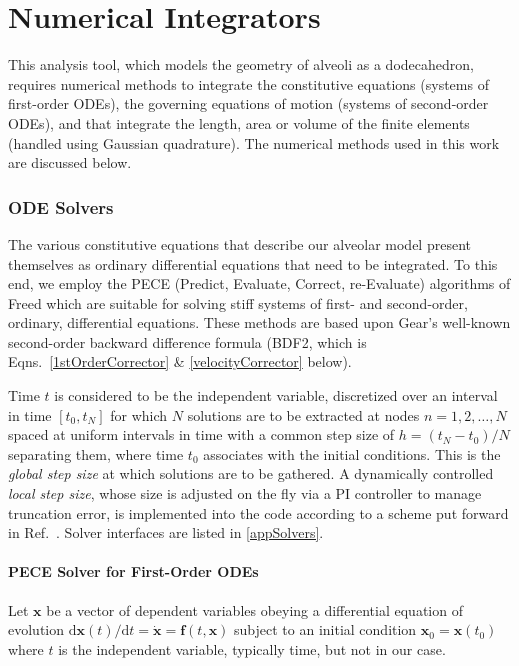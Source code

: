 \part{Numerical Integrators}
\label{partNumericalMethods}

This analysis tool, which models the geometry of alveoli as a dodecahedron, requires numerical methods to integrate the constitutive equations (systems of first-order ODEs), the governing equations of motion (systems of second-order ODEs), and that integrate the length, area or volume of the finite elements (handled using Gaussian quadrature).  The numerical methods used in this work are discussed below.

\section{ODE Solvers}

The various constitutive equations that describe our alveolar model present themselves as ordinary differential equations that need to be integrated.  To this end, we employ the PECE (Predict, Evaluate, Correct, re-Evaluate) algorithms of Freed \cite{Freed17a} which are suitable for solving stiff systems of first- and second-order, ordinary, differential equations.  These methods are based upon Gear's well-known second-order backward difference formula (BDF2, which is Eqns.~\ref{1stOrderCorrector} \& \ref{velocityCorrector} below).

Time $t$ is considered to be the independent variable, discretized over an interval in time $[t_0, t_N]$ for which $N$ solutions are to be extracted at nodes $n=1, 2, \ldots, N$ spaced at uniform intervals in time with a common step size of $h = (t_N - t_0)/N$ separating them, where time $t_0$ associates with the initial conditions.  This is the \textit{global step size\/} at which solutions are to be gathered.  A dynamically controlled \textit{local step size}, whose size is adjusted on the fly via a PI controller to manage truncation error, is implemented into the code according to a scheme put forward in Ref.~\cite{Soderlind02}.  Solver interfaces are listed in \ref{appSolvers}.

\subsection{PECE Solver for First-Order ODEs}
\label{sec:1stOrderPECE}

Let $\mathbf{x}$ be a vector of dependent variables obeying a differential equation of evolution $\mathrm{d} \mathbf{x}(t) / \mathrm{d} t = \dot{\mathbf{x}} = \mathbf{f} (t, \mathbf{x})$ subject to an initial condition $\mathbf{x}_0 = \mathbf{x}(t_0)$ where $t$ is the independent variable, typically time, but not in our case.

